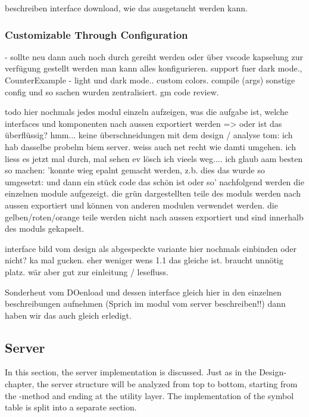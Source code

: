 beschreiben interface download, wie das ausgetaucht werden kann.

\subsubsection{Customizable Through Configuration}
  - sollte neu dann auch noch durch gereiht werden oder über vscode kapselung zur verfügung gestellt werden
man kann alles konfigurieren. support fuer dark mode.,
CounterExample  - light und dark mode.. custom colors.
compile (args)
sonstige config und so sachen wurden zentralisiert. gm code review.



todo hier nochmals jedes modul einzeln aufzeigen, was die aufgabe ist, welche interfaces und komponenten nach aussen exportiert werden
=> oder ist das überflüssig? hmm... keine überschneidungen mit dem design / analyse
tom: ich hab dasselbe probelm biem server. weiss auch net recht wie damti umgehen. ich liess es jetzt mal durch, mal sehen ev lösch ich vieels weg.... 
ich glaub aam besten so machen: 'konnte wieg epalnt gemacht werden, z.b. dies das wurde so umgesetzt: und dann ein stück code das schön ist oder so'
nachfolgend werden die einzelnen module aufgezeigt.
die grün dargestellten teile des moduls werden nach aussen exportiert und können von anderen modulen verwendet werden.
die gelben/roten/orange teile werden nicht nach aussen exportiert und sind innerhalb des moduls gekapselt.

interface bild vom design als abgespeckte variante hier nochmals einbinden oder nicht? ka mal gucken. eher weniger wens 1.1 das gleiche ist. braucht unnötig platz. wär aber gut zur einleitung / lesefluss.

Sonderheut vom DOenload und dessen interface gleich hier in den einzelnen beschreibungen aufnehmen (Sprich im modul vom server beschreiben!!) dann haben wir das auch gleich erledigt.



\subsection{Server}
In this section, the server implementation is discussed.
Just as in the Design-chapter, the server structure will be analyzed from top to bottom, starting from the -method and ending at the utility layer.
The implementation of the symbol table is split into a separate section.

